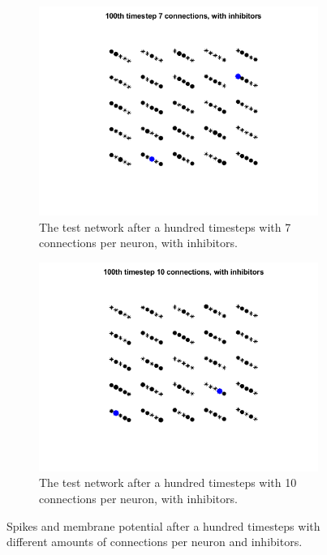 \begin{figure}
\begin{subfigure}[b]{0.225\textwidth}
        \includegraphics[width=\textwidth]{Images/pool_7_100_s.png}
        \caption{The test network after a hundred timesteps with 7 connections per neuron, with inhibitors.}
    \label{fig:reservoir_7_in}
    \end{subfigure}
     \begin{subfigure}[b]{0.225\textwidth}
        \includegraphics[width=\textwidth]{Images/pool_10_100_s.png}
        \caption{The test network after a hundred timesteps with 10 connections per neuron, with inhibitors.}
    \label{fig:reservoir_10_in}
    \end{subfigure}
    \caption{Spikes and membrane potential after a hundred timesteps with different amounts of connections per neuron and inhibitors.}
\end{figure}

